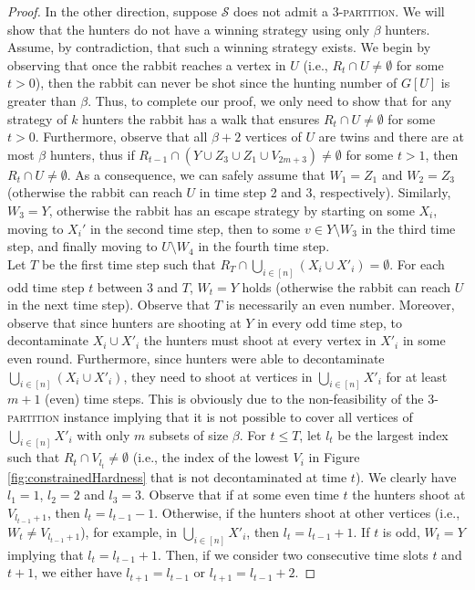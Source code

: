 \documentclass[runningheads]{llncs}
\begin{document}
\begin{proof}
In the other direction, suppose $\mathcal{S}$ does not admit a \textsc{3-partition}. We will show that the hunters do not have a winning strategy using only $\beta$ hunters. Assume, by contradiction, that such a winning strategy exists. We begin by observing that once the rabbit reaches a vertex in $U$ {(i.e., $R_{t}\cap U \neq \emptyset$ for some $t>0$)}, then the rabbit can never be shot since the hunting number of $G[U]$ is greater than $\beta$. {Thus, to complete our proof, we only need to show that for any strategy of $k$ hunters the rabbit has a walk that ensures $R_{t}\cap U \neq \emptyset$ for some $t>0$. Furthermore, {observe that} all $\beta+2$ vertices of $U$ are twins and there are at most $\beta$ hunters, {thus} if $R_{t-1}\cap (Y \cup Z_3 \cup Z_1 \cup V_{2m+3}) \neq \emptyset$ for some $t>1$, then $R_{t}\cap U \neq \emptyset$.}
As  a consequence, we can safely assume that $W_1=Z_1$ and $W_2={Z_3}$ (otherwise the rabbit can reach $U$ in time step 2 and 3, respectively). Similarly, $W_3 = Y$, otherwise the rabbit has an escape strategy by starting on some $X_i$, moving to $X_i'$ in the second time step, then to some $v \in Y \setminus W_3$ in the third time step, and finally moving to $U\setminus W_4$ in the fourth time step.\\  
Let $T$ be the first time step such that $R_T \cap \bigcup_{i \in [n]} (X_i \cup X'_i) = \emptyset $.  For each odd time step $t$ between $3$ and $T$, $W_t = Y$ holds (otherwise the rabbit can reach $U$ in the next time step). Observe that $T$ is necessarily an even number. {Moreover, observe that since hunters are shooting at $Y$ in every odd time step, to decontaminate $X_i\cup X'_i$ the hunters must shoot at every vertex in $X'_i$ in some even round.} Furthermore, since hunters were able to decontaminate $\bigcup_{i \in [n]} (X_i \cup X'_i)$, they need to shoot at vertices in $\bigcup_{i \in [n]}  X'_i$ for at least $m+1$ (even) time steps. This is obviously due to the non-feasibility of the \textsc{3-partition} instance implying that it is not possible to cover all vertices of $\bigcup_{i \in [n]}  X'_i$ with only $m$ subsets of size $\beta$. For $ t \leq T$, let $l_t$ be the largest index such that $R_t \cap V_{l_t} \neq \emptyset$ (i.e., the index of the lowest $V_i$ in Figure \ref{fig:constrainedHardness} that is not decontaminated {at time $t$}). We clearly have $l_1 = 1$, $l_2 = 2$ and $l_3 = 3$.  Observe that if at some even time $t$ the hunters shoot at $V_{l_{t-1}+1}$, then $l_t = l_{t-1} - 1$. 
Otherwise, if the hunters shoot at other vertices ({i.e., $W_t \neq V_{l_{t-1}+1}$}), for example, in  $\bigcup_{i \in [n]}  X'_i$, then $l_t = l_{t-1} + 1$. If $t$ is odd,  $W_t = Y$ implying that $l_t = l_{t-1} + 1$.  Then, if we consider two consecutive time slots $t$ and $t+1$, we either have $l_{t+1} = l_{t-1}$ or $l_{t+1} = l_{t-1} + 2$.  

\end{proof}
\end{document}
